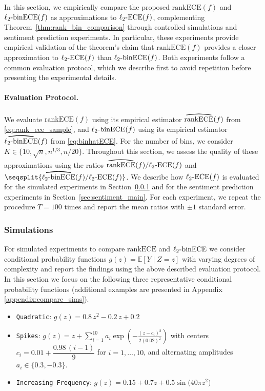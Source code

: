 \documentclass[11pt]{article}
\numberwithin{equation}{section}
\theoremstyle{definition}
\newcommand{\E}{\mathbb{E}}
\newcommand{\myoverline}[2][3.5em]{%
  \overset{%
    \tikz[baseline=-0.1ex]{
      \draw[line width=0.75pt]
        (0,0) .. controls (#1/2,0.5ex) .. (#1,0);
    }%
  }{#2}%
}
\newcommand{\ECE}{\mathrm{ECE}}
\newcommand{\lECE}{\ell_2\textnormal{-}\ECE}
\newcommand{\binECE}{\mathrm{binECE}}
\newcommand{\lbinECE}{\ell_2\textnormal{-}\binECE}
\newcommand{\binhatECE}{\myoverline{\lbinECE}}
\newcommand{\rankECE}{\mathrm{rankECE}}
\newcommand{\hatrankECE}{\myoverline{\rankECE}}
\begin{document}
In this section, we empirically compare the proposed $\rankECE(f)$ and $\lbinECE(f)$ as approximations to $\lECE(f)$, complementing Theorem~\ref{thm:rank_bin_comparison} through controlled simulations and sentiment prediction experiments. In particular, these experiments provide empirical validation of the theorem's claim that $\rankECE(f)$ provides a closer approximation to $\lECE(f)$ than $\lbinECE(f)$. Both experiments follow a common evaluation protocol, which we describe first to avoid repetition before presenting the experimental details.

\paragraph{Evaluation Protocol.}
We evaluate $\rankECE(f)$ using its empirical estimator $\hatrankECE(f)$ from \eqref{eq:rank_ece_sample}, and $\lbinECE(f)$ using its empirical estimator $\binhatECE(f)$ from \eqref{eq:binhatECE}. For the number of bins, we consider $K\in\{10,\sqrt{n},n^{1/3},n/20\}$. Throughout this section, we assess the quality of these approximations using the ratios $\hatrankECE(f)/\lECE(f)$ and $\seqsplit{\binhatECE(f)/\lECE(f)}$. We describe how $\lECE(f)$ is evaluated for the simulated experiments in Section~\ref{sec:compare_sims} and for the sentiment prediction experiments in Section~\ref{sec:sentiment_main}. For each experiment, we repeat the procedure $T=100$ times and report the mean ratios with $\pm 1$ standard error.

\subsubsection{Simulations}\label{sec:compare_sims}
For simulated experiments to compare $\rankECE$ and $\lbinECE$ we consider conditional probability functions $g(z) = \E[Y\mid Z = z]$ with varying degrees of complexity and report the findings using the above described evaluation protocol. In this section we focus on the following three representative conditional probability functions (additional examples are presented in Appendix \ref{appendix:compare_sims}).

\begin{itemize}
    \item \texttt{Quadratic}: $g(z) = 0.8\,z^2 - 0.2\,z + 0.2$
    \item \texttt{Spikes}: $g(z) = z + \sum_{i=1}^{10} a_i \exp\!\left(-\frac{(z - c_i)^2}{2 (0.02)^2}\right)$ with centers $c_i = 0.01 + \dfrac{0.98\,(i-1)}{9}$ for $i=1,\dots,10$, and alternating amplitudes $a_i \in \{0.3, -0.3\}$.
    \item \texttt{Increasing Frequency}: $g(z) = 0.15 + 0.7 z + 0.5 \sin\!\big(40\pi z^2\big)$
\end{itemize}
\end{document}
